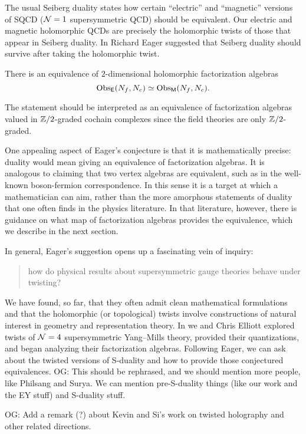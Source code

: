 \documentclass[11pt]{amsart}
\def\owen#1{{\textcolor{violet!65!black}{OG: {#1}}}}
\begin{document}
The usual Seiberg duality states how certain ``electric'' and ``magnetic'' versions of SQCD ($\mathcal N=1$ supersymmetric QCD) should be equivalent.
Our electric and magnetic holomorphic QCDs are precisely the holomorphic twists of those that appear in Seiberg duality.
In \cite{Eager} Richard Eager suggested that Seiberg duality should survive after taking the holomorphic twist.

\begin{conj}
There is an equivalence of $2$-dimensional holomorphic factorization algebras
\[
{\rm Obs}_{\mathsf E}(N_f, N_c) \simeq {\rm Obs}_{{\sf M}} (N_f, N_c)  .
\]
\end{conj}

The statement should be interpreted as an equivalence of factorization algebras valued in $\mathbb Z/2$-graded cochain complexes since the field theories are only $\mathbb Z/2$-graded.

One appealing aspect of Eager's conjecture is that it is mathematically precise:
duality would mean giving an equivalence of factorization algebras.
It is analogous to claiming that two vertex algebras are equivalent,
such as in the well-known boson-fermion correspondence.
In this sense it is a target at which a mathematician can aim,
rather than the more amorphous statements of duality that one often finds in the physics literature.
In that literature, however, there is guidance on what map of factorization algebras provides the equivalence,
which we describe in the next section.

In general, Eager's suggestion opens up a fascinating vein of inquiry:
\begin{quote}
how do physical results about supersymmetric gauge theories behave under twisting?
\end{quote}
We have found, so far, that they often admit clean mathematical formulations and that the holomorphic (or topological) twists involve constructions of natural interest in geometry and representation theory.
In \cite{EGW} we and Chris Elliott explored twists of $\mathcal N=4$ supersymmetric Yang--Mills theory,
provided their quantizations, and began analyzing their factorization algebras.
Following Eager, we can ask about the twisted versions of S-duality and how to provide those conjectured equivalences.
\owen{This should be rephrased, and we should mention more people, like Philsang and Surya. We can mention pre-S-duality things (like our work and the EY stuff) and S-duality stuff.}

\owen{Add a remark (?) about Kevin and Si's work on twisted holography and other related directions.}
\end{document}
